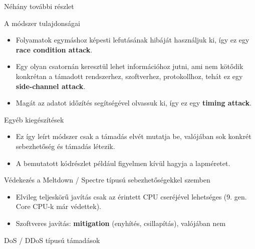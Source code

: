 \documentclass[12 pt]{beamer}
\begin{document}
\begin{frame}{Néhány további részlet}
  \begin{block}{A módszer tulajdonságai}
    \begin{itemize}
      \item{Folyamatok egymáshoz képesti lefutásának hibáját használjuk ki, így ez egy \textbf{race condition attack}.}
      \item{Egy olyan csatornán keresztül lehet információhoz jutni, ami nem kötődik konkrétan
        a támadott rendszerhez, szoftverhez, protokollhoz, tehát ez egy \textbf{side-channel attack}.}
      \item{Magát az adatot időzítés segítségével olvassuk ki, így ez egy \textbf{timing attack}.}
    \end{itemize}
  \end{block}

  \begin{block}{Egyéb kiegészítések}
    \begin{itemize}
      \item{Ez így leírt módszer csak a támadás elvét mutatja be, valójában sok konkrét sebezhetőség és támadás létezik.}
      \item{A bemutatott kódrészlet például figyelmen kívül hagyja a lapméretet.}
    \end{itemize}
  \end{block}
\end{frame}

\begin{frame}{Védekezés a Meltdown / Spectre típusú sebezhetőségekkel szemben}
  \begin{itemize}
    \item{Elvileg teljeskörű javítás csak az érintett CPU cseréjével lehetséges (9. gen. Core CPU-k már védettek).}
    \item{Szoftveres javítás: \textbf{mitigation} (enyhítés, csillapítás), valójában nem }
  \end{itemize}
\end{frame}

\begin{frame}{DoS / DDoS típusú támadások}

\end{frame}
\end{document}
